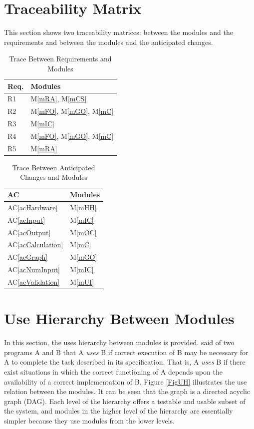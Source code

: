 \documentclass[12pt, titlepage]{article}
\newcommand{\acref}[1]{AC\ref{#1}}
\newcommand{\mref}[1]{M\ref{#1}}
\begin{document}
\section{Traceability Matrix} \label{SecTM}

This section shows two traceability matrices: between the modules and the
requirements and between the modules and the anticipated changes.

\begin{table}[H]
\centering
\begin{tabular}{p{} p{}}
\toprule
\textbf{Req.} & \textbf{Modules}\\
\midrule
R1 & \mref{mRA}, \mref{mCS}\\
R2 & \mref{mFO}, \mref{mGO}, \mref{mC}\\
R3 & \mref{mIC}\\
R4 & \mref{mFO}, \mref{mGO}, \mref{mC}\\
R5 & \mref{mRA}\\
\bottomrule
\end{tabular}
\caption{Trace Between Requirements and Modules}
\label{TblRT}
\end{table}

\begin{table}[H]
\centering
\begin{tabular}{p{} p{}}
\toprule
\textbf{AC} & \textbf{Modules}\\
\midrule
\acref{acHardware} & \mref{mHH}\\
\acref{acInput} & \mref{mIC}\\
\acref{acOutput} & \mref{mOC}\\
\acref{acCalculation} & \mref{mC}\\
\acref{acGraph} & \mref{mGO}\\
\acref{acNumInput} & \mref{mIC}\\
\acref{acValidation} & \mref{mUI}\\
\bottomrule
\end{tabular}
\caption{Trace Between Anticipated Changes and Modules}
\label{TblACT}
\end{table}

\section{Use Hierarchy Between Modules} \label{SecUse}

In this section, the uses hierarchy between modules is
provided. \citet{Parnas1978} said of two programs A and B that A {\em uses} B if
correct execution of B may be necessary for A to complete the task described in
its specification. That is, A {\em uses} B if there exist situations in which
the correct functioning of A depends upon the availability of a correct
implementation of B.  Figure \ref{FigUH} illustrates the use relation between
the modules. It can be seen that the graph is a directed acyclic graph
(DAG). Each level of the hierarchy offers a testable and usable subset of the
system, and modules in the higher level of the hierarchy are essentially simpler
because they use modules from the lower levels.
\end{document}
